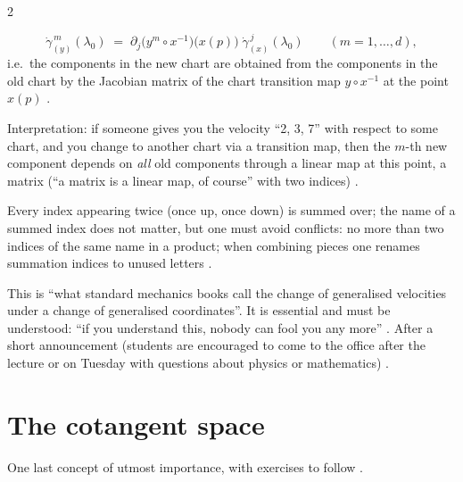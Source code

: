 \begin{paracol}{2}
\begin{theorem}\label{thm:ts-comp-trafo}
\[
  \dot\gamma^{\,m}_{(y)}(\lambda_0)\;=\;\partial_j\bigl(y^m\circ x^{-1}\bigr)\bigl(x(p)\bigr)\;\dot\gamma^{\,j}_{(x)}(\lambda_0)
  \qquad(m=1,\dots,d),
\]
i.e.\ the components in the new chart are obtained from the components in the old chart by the Jacobian matrix of the chart
transition map $y\circ x^{-1}$ at the point $x(p)$ .
\end{theorem}
Interpretation: if someone gives you the velocity ``2, 3, 7'' with respect to some chart, and you change to another chart
via a transition map, then the $m$-th new component depends on \emph{all} old components through a linear map at this point,
a matrix (``a matrix is a linear map, of course'' with two indices) .

\begin{coursenote}
Every index appearing twice (once up, once down) is summed over; the name of a summed index does not matter, but one must
avoid conflicts: no more than two indices of the same name in a product; when combining pieces one renames summation indices to
unused letters .
\end{coursenote}
This is ``what standard mechanics books call the change of generalised velocities under a change of generalised
coordinates''. It is essential and must be understood: ``if you understand this, nobody can fool you any more''
. After a short announcement (students are encouraged to come to the
office after the lecture or on Tuesday with questions about physics or mathematics) .

\section{The cotangent space}\label{sec:ts-cotangent}

One last concept of utmost importance, with exercises to follow .


\end{paracol}
